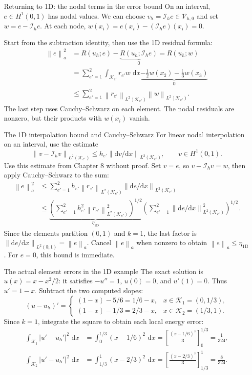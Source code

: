 \documentclass[11pt,aspectratio=169]{beamer}
\newcommand{\dd}{\,\mathrm{d}}
\newcommand{\Vhzero}{\mathcal V_{h,0}}
\newcommand{\Ih}{\mathcal I_h}
\newcommand{\norm}[2][]{\left\lVert#2\right\rVert_{#1}}
\begin{document}
\begin{frame}{Returning to 1D: the nodal terms in the error bound}
On an interval, $e\in H^1(0,1)$ has nodal values. We can choose
$v_h=\Ih e\in\Vhzero$ and set $w=e-\Ih e$. At each node,
$w(x_i)=e(x_i)-(\Ih e)(x_i)=0$.

Start from the subtraction identity, then use the 1D residual formula:
\[
\begin{aligned}
 \norm[a]{e}^2
 &=R(u_h;e)-\underbrace{R(u_h;\Ih e)}_{0}=R(u_h;w)\\
 &=\sum_{e'=1}^2\int_{\mathcal K_{e'}}r_{e'}w\,\dd x
   \underbrace{-\frac12w(x_2)-\frac13w(x_3)}_{0}\\
 &\leq\sum_{e'=1}^2\norm[L^2(\mathcal K_{e'})]{r_{e'}}
                         \norm[L^2(\mathcal K_{e'})]{w}.
\end{aligned}
\]
The last step uses Cauchy--Schwarz on each element. The nodal residuals
are nonzero, but their products with $w(x_i)$ vanish.
\end{frame}

\begin{frame}{The 1D interpolation bound and Cauchy--Schwarz}
For linear nodal interpolation on an interval, use the estimate
\[
 \norm[L^2(\mathcal K_{e'})]{v-\Ih v}
 \leq h_{e'}\norm[L^2(\mathcal K_{e'})]{\mathrm dv/\mathrm dx},
 \qquad v\in H^1(0,1).
\]
Use this estimate from Chapter 8 without proof. Set $v=e$, so
$v-\Ih v=w$, then apply Cauchy--Schwarz to the sum:
\[
\begin{aligned}
 \norm[a]{e}^2
 &\leq\sum_{e'=1}^2h_{e'}\norm[L^2(\mathcal K_{e'})]{r_{e'}}
                  \norm[L^2(\mathcal K_{e'})]{\mathrm de/\mathrm dx}\\
 &\leq\underbrace{\left(\sum_{e'=1}^2
 h_{e'}^2\norm[L^2(\mathcal K_{e'})]{r_{e'}}^2\right)^{1/2}}_{
 \eta_{\mathrm{1D}}}
 \left(\sum_{e'=1}^2\norm[L^2(\mathcal K_{e'})]{\mathrm de/\mathrm dx}^2
 \right)^{1/2}.
\end{aligned}
\]
Since the elements partition $(0,1)$ and $k=1$, the last factor is
$\norm[L^2(0,1)]{\mathrm de/\mathrm dx}=\norm[a]{e}$.
Cancel $\norm[a]{e}$ when nonzero to obtain
$\norm[a]{e}\leq\eta_{\mathrm{1D}}$. For $e=0$, this bound is immediate.
\end{frame}

\begin{frame}{The actual element errors in the 1D example}
The exact solution is $u(x)=x-x^2/2$: it satisfies $-u''=1$, $u(0)=0$,
and $u'(1)=0$. Thus $u'=1-x$. Subtract the two computed slopes:
\[
 (u-u_h)'=\begin{cases}
 (1-x)-5/6=1/6-x,&x\in\mathcal K_1=(0,1/3),\\
 (1-x)-1/3=2/3-x,&x\in\mathcal K_2=(1/3,1).
 \end{cases}
\]
Since $k=1$, integrate the square to obtain each local energy error:
\[
\begin{aligned}
 \int_{\mathcal K_1}|u'-u_h'|^2\,\dd x
 &=\int_0^{1/3}(x-1/6)^2\,\dd x
 =\left[\frac{(x-1/6)^3}{3}\right]_0^{1/3}=\frac1{324},\\[4pt]
 \int_{\mathcal K_2}|u'-u_h'|^2\,\dd x
 &=\int_{1/3}^1(x-2/3)^2\,\dd x
 =\left[\frac{(x-2/3)^3}{3}\right]_{1/3}^1=\frac8{324}.
\end{aligned}
\]
\end{frame}
\end{document}
